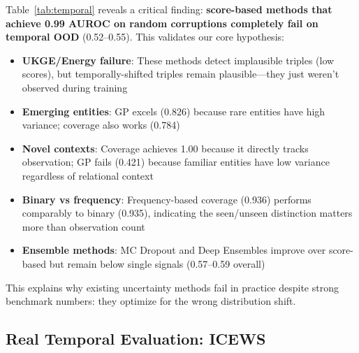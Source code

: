 Table~\ref{tab:temporal} reveals a critical finding: \textbf{score-based methods that achieve 0.99 AUROC on random corruptions completely fail on temporal OOD} (0.52--0.55). This validates our core hypothesis:

\begin{itemize}
    \item \textbf{UKGE/Energy failure}: These methods detect implausible triples (low scores), but temporally-shifted triples remain plausible---they just weren't observed during training
    \item \textbf{Emerging entities}: GP excels (0.826) because rare entities have high variance; coverage also works (0.784)
    \item \textbf{Novel contexts}: Coverage achieves 1.00 because it directly tracks observation; GP fails (0.421) because familiar entities have low variance regardless of relational context
    \item \textbf{Binary vs frequency}: Frequency-based coverage (0.936) performs comparably to binary (0.935), indicating the seen/unseen distinction matters more than observation count
    \item \textbf{Ensemble methods}: MC Dropout and Deep Ensembles improve over score-based but remain below single signals (0.57--0.59 overall)
\end{itemize}

This explains why existing uncertainty methods fail in practice despite strong benchmark numbers: they optimize for the wrong distribution shift.

\subsection{Real Temporal Evaluation: ICEWS}

